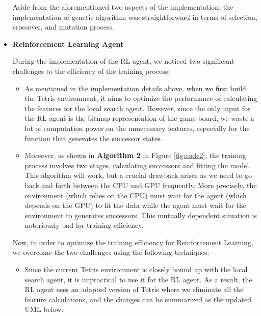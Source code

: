 \documentclass[letterpaper]{article} %
\begin{document}
\begin{itemize}
  
  Aside from the aforementioned two aspects of the implementation, the implementation of genetic algorithm was straightforward in terms of selection, crossover, and mutation process.
  
  \item \textbf{Reinforcement Learning Agent}
  
During the implementation of the RL agent, we noticed two significant challenges to the efficiency of the training process:
\begin{itemize}
  \item 
  As mentioned in the implementation details above, when we first build the Tetris environment, it aims to optimize the performance of calculating the features for the local search agent. However, since the only input for the RL agent is the bitmap representation of the game board, we waste a lot of computation power on the unnecessary features, especially for the function that generates the successor states.
  \item 
  Moreover, as shown in {\bf Algorithm 2} in Figure \ref{fig:code2}, the training process involves two stages, calculating successors and fitting the model. This algorithm will work, but a crucial drawback arises as we need to go back and forth between the CPU and GPU frequently. More precisely, the environment (which relies on the CPU) must wait for the agent (which depends on the GPU) to fit the data while the agent must wait for the environment to generates successors. This mutually dependent situation is notoriously bad for training efficiency.
\end{itemize}
Now, in order to optimize the training efficiency for Reinforcement Learning, we overcome the two challenges using the following techniques.
\begin{itemize}
  \item 
  Since the current Tetris environment is closely bound up with the local search agent, it is impractical to use it for the RL agent. As a result, the RL agent uses an adapted version of Tetris where we eliminate all the feature calculations, and the changes can be summarized as the updated UML below:


\end{itemize}
\end{itemize}
\end{document}
